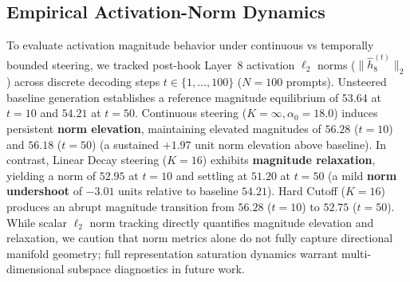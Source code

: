 \documentclass[conference]{IEEEtran}
\begin{document}
\begin{table}[t]
\caption{Statistical Significance \& Pairwise Contingency Matrix for High-Cap Natural Completion ($N_{\text{test}}=500$, \texttt{max\_new\_tokens=800}, Exact Binomial McNemar, $B=10,000$ Percentile Bootstrap, Seed=42)}
\label{tab:mcnemar}
\centering
{}
\end{table}

\subsection{Empirical Activation-Norm Dynamics}
To evaluate activation magnitude behavior under continuous vs temporally bounded steering, we tracked post-hook Layer~8 activation $\ell_2$ norms ($\|\hat{h}_8^{(t)}\|_2$) across discrete decoding steps $t \in \{1, \ldots, 100\}$ ($N=100$ prompts). Unsteered baseline generation establishes a reference magnitude equilibrium of $53.64$ at $t=10$ and $54.21$ at $t=50$. Continuous steering ($K=\infty, \alpha_0=18.0$) induces persistent \textbf{norm elevation}, maintaining elevated magnitudes of $56.28$ ($t=10$) and $56.18$ ($t=50$) (a sustained $+1.97$ unit norm elevation above baseline). In contrast, Linear Decay steering ($K=16$) exhibits \textbf{magnitude relaxation}, yielding a norm of $52.95$ at $t=10$ and settling at $51.20$ at $t=50$ (a mild \textbf{norm undershoot} of $-3.01$ units relative to baseline $54.21$). Hard Cutoff ($K=16$) produces an abrupt magnitude transition from $56.28$ ($t=10$) to $52.75$ ($t=50$). While scalar $\ell_2$ norm tracking directly quantifies magnitude elevation and relaxation, we caution that norm metrics alone do not fully capture directional manifold geometry; full representation saturation dynamics warrant multi-dimensional subspace diagnostics in future work.
\end{document}
